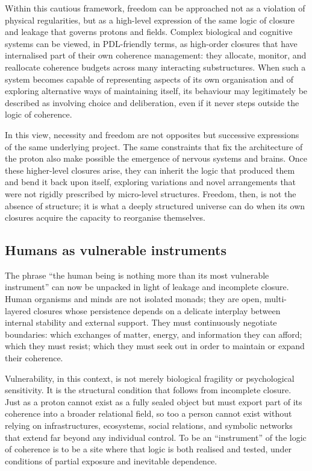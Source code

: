 \documentclass[11pt,a4paper]{article}
\theoremstyle{definition}
\begin{document}
Within this cautious framework, freedom can be approached not as a violation of physical regularities, but as a high-level expression of the same logic of closure and leakage that governs protons and fields. Complex biological and cognitive systems can be viewed, in PDL-friendly terms, as high-order closures that have internalised part of their own coherence management: they allocate, monitor, and reallocate coherence budgets across many interacting substructures.\cite{Laubscher_Existence_PulsatingClosure_2026} When such a system becomes capable of representing aspects of its own organisation and of exploring alternative ways of maintaining itself, its behaviour may legitimately be described as involving choice and deliberation, even if it never steps outside the logic of coherence.

In this view, necessity and freedom are not opposites but successive expressions of the same underlying project. The same constraints that fix the architecture of the proton also make possible the emergence of nervous systems and brains. Once these higher-level closures arise, they can inherit the logic that produced them and bend it back upon itself, exploring variations and novel arrangements that were not rigidly prescribed by micro-level structures.\cite{Laubscher_PDL_TO_Dialogue_2024} Freedom, then, is not the absence of structure; it is what a deeply structured universe can do when its own closures acquire the capacity to reorganise themselves.

\subsection{Humans as vulnerable instruments}

The phrase ``the human being is nothing more than its most vulnerable instrument'' can now be unpacked in light of leakage and incomplete closure. Human organisms and minds are not isolated monads; they are open, multi-layered closures whose persistence depends on a delicate interplay between internal stability and external support.\cite{Laubscher_Existence_PulsatingClosure_2026} They must continuously negotiate boundaries: which exchanges of matter, energy, and information they can afford; which they must resist; which they must seek out in order to maintain or expand their coherence.

Vulnerability, in this context, is not merely biological fragility or psychological sensitivity. It is the structural condition that follows from incomplete closure. Just as a proton cannot exist as a fully sealed object but must export part of its coherence into a broader relational field, so too a person cannot exist without relying on infrastructures, ecosystems, social relations, and symbolic networks that extend far beyond any individual control.\cite{Laubscher_UniversalCoherenceLeakage_2024,Laubscher_PDL_TO_Dialogue_2024} To be an ``instrument'' of the logic of coherence is to be a site where that logic is both realised and tested, under conditions of partial exposure and inevitable dependence.
\end{document}
